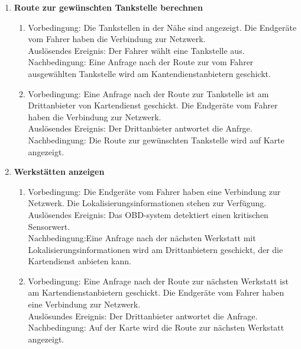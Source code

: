 \documentclass[pflichtenheft.tex]{subfiles}
\begin{document}
\begin{enumerate}
\begin{enumerate}
  	\item {\textbf{Route zur gewünschten Tankstelle berechnen}} 
  	\begin{enumerate}
  		\item 
  		Vorbedingung: Die Tankstellen in der Nähe sind angezeigt. Die Endgeräte vom
  		Fahrer haben die Verbindung zur Netzwerk.
  		\\Auslösendes Ereignis: Der Fahrer wählt eine Tankstelle aus.
  		\\Nachbedingung: Eine Anfrage nach der Route zur vom Fahrer ausgewählten
  		Tankstelle wird am Kantendienstanbietern geschickt.
  		\item
  		Vorbedingung: Eine Anfrage nach der Route zur Tankstelle ist am
  		Drittanbieter von Kartendienst geschickt. Die Endgeräte vom Fahrer haben die
  		Verbindung zur Netzwerk.
  		\\Auslösendes Ereignis: Der Drittanbieter antwortet die Anfrge.
  		\\Nachbedingung: Die Route zur gewünschten Tankstelle wird auf Karte
  		angezeigt.
  		\end{enumerate}
  
	\item{\textbf{Werkstätten anzeigen}} 
	\begin{enumerate}
		\item 
		Vorbedingung: Die Endgeräte vom Fahrer haben eine Verbindung zur Netzwerk.
		Die Lokalisierungsinformationen stehen zur Verfügung.
		\\Auslösendes Ereignis: Das OBD-system detektiert einen kritischen Sensorwert.
		\\Nachbedingung:Eine Anfrage nach der nächsten Werkstatt mit
	 	Lokalisierungsinformationen wird am Drittanbietern geschickt, der die
	 	Kartendienst anbieten kann.
	 	\item
		Vorbedingung: Eine Anfrage nach der Route zur nächsten Werkstatt ist am
		Kartendienstanbietern geschickt. Die Endgeräte vom Fahrer haben eine
		Verbindung zur Netzwerk.
		\\Auslösundes Ereignis: Der Drittanbieter antwortet die Anfrage.
		\\Nachbedingung: Auf der Karte wird die Route zur nächsten Werkstatt
		angezeigt.
		\end{enumerate}

	\end{enumerate}
\end{enumerate}


\end{document}
